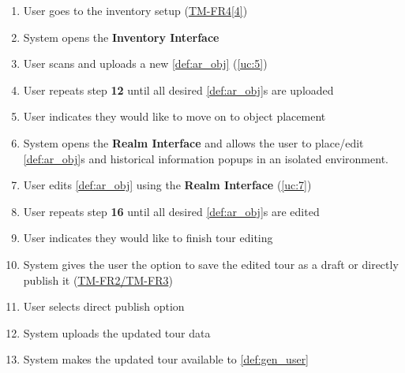 \documentclass{article}
\begin{document}
\begin{enumerate}[label=\textbf{UC\arabic*}]
\begin{enumerate}[label=\textbf{\arabic*.}]
            \item User goes to the inventory setup (\hyperref[ssub:tour_management]{TM-FR4[4]})
            \item System opens the \textbf{Inventory Interface}
            \item User scans and uploads a new \ref{def:ar_obj} (\ref{uc:5})
            \item User repeats step \textbf{12} until all desired \ref{def:ar_obj}s are uploaded
            \item User indicates they would like to move on to object placement
            \item System opens the \textbf{Realm Interface} and allows the user to place/edit \ref{def:ar_obj}s and historical information popups in an isolated environment.
            \item User edits \ref{def:ar_obj} using the \textbf{Realm Interface} (\ref{uc:7})
            \item User repeats step \textbf{16} until all desired \ref{def:ar_obj}s are edited
            \item User indicates they would like to finish tour editing
            \item System gives the user the option to save the edited tour as a draft or directly publish it (\hyperref[ssub:tour_management]{TM-FR2/TM-FR3})
            \item User selects direct publish option
            \item System uploads the updated tour data
            \item System makes the updated tour available to \ref{def:gen_user}
        \end{enumerate}


\end{enumerate}
\end{document}
